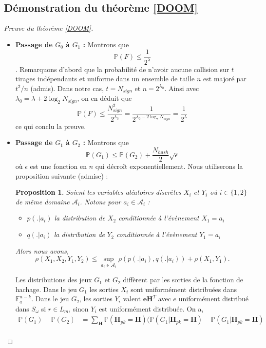 \documentclass[12pt]{article}
\theoremstyle{plain}
\newtheorem{propo}[thm]{Proposition}
\theoremstyle{definition}
\newcommand{\F}{\mathbb{F}}
\newcommand{\e}{\mathbf{e}}
\begin{document}
\begin{appendix}
\subsection*{Démonstration du théorème \ref{DOOM}}
\begin{proof}[Preuve du théorème \ref{DOOM}] \
\begin{itemize}
\item \textbf{Passage de $G_0$ à $G_1$ : } Montrons que $$\mathbb{P}(F) \leq \frac{1}{2^\lambda}$$.
Remarquons d'abord que la probabilité de n'avoir aucune collision sur $t$ tirages indépendants et uniforme dans un ensemble de taille $n$ est majoré par $t^2/n$ (admis). Dans notre cas, $t=N_{sign}$ et $n=2^{\lambda_0}$. Ainsi avec $\lambda_0 = \lambda +2 \log_2N_{sign}$, on en déduit que 
$$ \mathbb{P}(F) \leq \frac{N^2_{sign}}{2^{\lambda_0}}=\frac{1}{2^{\lambda_0 -2 \log_2N_{sign}}} =\frac{1}{2^\lambda}$$ ce qui conclu la preuve.
\item \textbf{Passage de $G_1$ à $G_2$ : } Montrons que $$ \mathbb{P}(G_1) \leq  \mathbb{P}(G_2) +  \frac{N_{hash}}{2}\sqrt{\epsilon} $$
où $\epsilon$ est une fonction en $n$ qui décroît exponentiellement.
Nous utiliserons la proposition suivante (admise) :
\begin{propo} Soient les variables aléatoires discrètes $X_i$ et $Y_i$ où $i \in \{1,2\}$ de même domaine $\mathcal{A}_i$. Notons pour $a_i \in \mathcal{A}_i$ :
	\begin{itemize}
	\item $p(.|a_i)$ la distribution de $X_2$ conditionnée à l'évènement $X_1 = a_i$
	\item $q(.|a_i)$ la distribution de $Y_2$ conditionnée à l'évènement $Y_1 = a_i$
	\end{itemize}
Alors nous avons,
$$\rho(X_1,X_2,Y_1,Y_2) \leq \sup_{a_i \in \mathcal{A}_i}\rho(p(.|a_i),q(.|a_i)) + \rho(X_1,Y_1).$$
\end{propo}
Les distributions des jeux $G_1$ et $G_2$ diffèrent par les sorties de la fonction de hachage. Dans le jeu $G_1$ les sorties $X_i$ sont uniformément distribuées dans $\F_q^{n-k}$. Dans le jeu  $G_2$, les sorties $Y_i$ valent $\e\mathbf{H}^T$ avec $e$ uniformément distribué dans $S_{\omega}$ si $r\in L_m$, sinon $Y_i$ est uniformément distribuée.  On a,
\begin{equation}
\begin{split}
\mathbb{P}(G_1) - \mathbb{P}(G_2) &= \sum_{\mathbf{H}}\mathbb{P}(\mathbf{H}_{pk}=\mathbf{H})(\mathbb{P}(G_1|\mathbf{H}_{pk}=\mathbf{H})-\mathbb{P}(G_1|\mathbf{H}_{pk}=\mathbf{H}) \\

\end{split}
\end{equation}
\end{itemize}
\end{proof}
\end{appendix}
\end{document}
